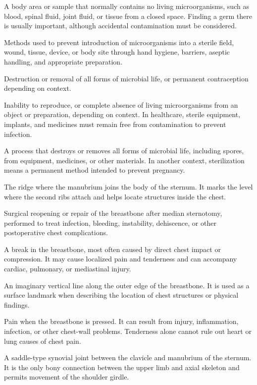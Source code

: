  A body area or sample that normally contains no living microorganisms, such as blood, spinal fluid, joint fluid, or tissue from a closed space. Finding a germ there is usually important, although accidental contamination must be considered.

 Methods used to prevent introduction of microorganisms into a sterile field, wound, tissue, device, or body site through hand hygiene, barriers, aseptic handling, and appropriate preparation.

 Destruction or removal of all forms of microbial life, or permanent contraception depending on context.

 Inability to reproduce, or complete absence of living microorganisms from an object or preparation, depending on context. In healthcare, sterile equipment, implants, and medicines must remain free from contamination to prevent infection.

 A process that destroys or removes all forms of microbial life, including spores, from equipment, medicines, or other materials. In another context, sterilization means a permanent method intended to prevent pregnancy.

 The ridge where the manubrium joins the body of the sternum. It marks the level where the second ribs attach and helps locate structures inside the chest.

 Surgical reopening or repair of the breastbone after median sternotomy, performed to treat infection, bleeding, instability, dehiscence, or other postoperative chest complications.

 A break in the breastbone, most often caused by direct chest impact or compression. It may cause localized pain and tenderness and can accompany cardiac, pulmonary, or mediastinal injury.

 An imaginary vertical line along the outer edge of the breastbone. It is used as a surface landmark when describing the location of chest structures or physical findings.

 Pain when the breastbone is pressed. It can result from injury, inflammation, infection, or other chest-wall problems. Tenderness alone cannot rule out heart or lung causes of chest pain.

 A saddle-type synovial joint between the clavicle and manubrium of the sternum. It is
the only bony connection between the upper limb and axial skeleton and permits movement
of the shoulder girdle.


